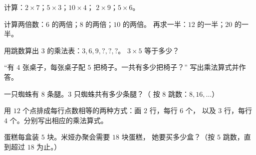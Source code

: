 \begin{exercise}[$\star$]\label{exo:g2:mult:4}
计算：$2 \times 7$；\quad $5 \times 3$；\quad $10 \times 4$；
\quad $2 \times 9$；\quad $5 \times 6$。
\end{exercise}

\begin{exercise}[$\star$]\label{exo:g2:mult:5}
计算两倍数：$6$ 的两倍；$8$ 的两倍；$10$ 的两倍。
再求一半：$12$ 的一半；$20$ 的一半。
\end{exercise}

\begin{exercise}[$\star$]\label{exo:g2:mult:6}
用跳数算出 $3$ 的乘法表：$3, 6, 9, ?, ?, ?$。
$3 \times 5$ 等于多少？
\end{exercise}

\begin{exercise}[$\star$]\label{exo:g2:mult:7}
“有 $4$ 张桌子，每张桌子配 $5$ 把椅子。一共有多少把椅子？”
写出乘法算式并作答。
\end{exercise}

\begin{exercise}[$\star$]\label{exo:g2:mult:8}
一只蜘蛛有 $8$ 条腿。$3$ 只蜘蛛共有多少条腿？（
按 $8$ 跳数：$8, 16, \dots$）
\end{exercise}

\begin{exercise}[$\star$]\label{exo:g2:mult:9}
用 $12$ 个点排成每行点数相等的两种方式：画 $2$ 行，每行 $6$ 个，
以及 $3$ 行，每行 $4$ 个。分别写出相应的乘法算式。
\end{exercise}

\begin{exercise}[$\star\star$]\label{exo:g2:mult:10}
蛋糕每盒装 $5$ 块。米娅办聚会需要 $18$ 块蛋糕，
她要买多少盒？（按 $5$ 跳数，直到超过 $18$ 为止。）
\end{exercise}
